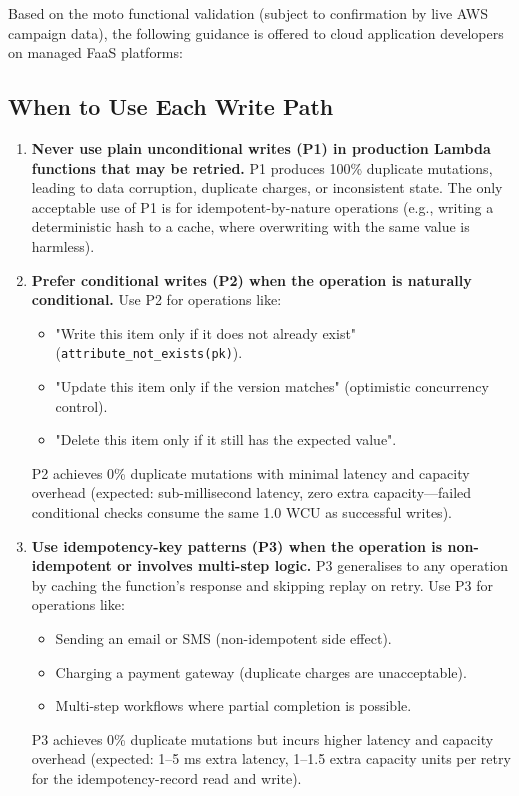 Based on the moto functional validation (subject to confirmation by live AWS campaign data), the following guidance is offered to cloud application developers on managed FaaS platforms:

\subsection{When to Use Each Write Path}

\begin{enumerate}
    \item \textbf{Never use plain unconditional writes (P1) in production Lambda functions that may be retried.} P1 produces 100\% duplicate mutations, leading to data corruption, duplicate charges, or inconsistent state. The only acceptable use of P1 is for idempotent-by-nature operations (e.g., writing a deterministic hash to a cache, where overwriting with the same value is harmless).
    
    \item \textbf{Prefer conditional writes (P2) when the operation is naturally conditional.} Use P2 for operations like:
    \begin{itemize}
        \item "Write this item only if it does not already exist" (\texttt{attribute\_not\_exists(pk)}).
        \item "Update this item only if the version matches" (optimistic concurrency control).
        \item "Delete this item only if it still has the expected value".
    \end{itemize}
    P2 achieves 0\% duplicate mutations with minimal latency and capacity overhead (expected: sub-millisecond latency, zero extra capacity---failed conditional checks consume the same 1.0 WCU as successful writes).
    
    \item \textbf{Use idempotency-key patterns (P3) when the operation is non-idempotent or involves multi-step logic.} P3 generalises to any operation by caching the function's response and skipping replay on retry. Use P3 for operations like:
    \begin{itemize}
        \item Sending an email or SMS (non-idempotent side effect).
        \item Charging a payment gateway (duplicate charges are unacceptable).
        \item Multi-step workflows where partial completion is possible.
    \end{itemize}
    P3 achieves 0\% duplicate mutations but incurs higher latency and capacity overhead (expected: 1--5 ms extra latency, 1--1.5 extra capacity units per retry for the idempotency-record read and write).
    

\end{enumerate}
